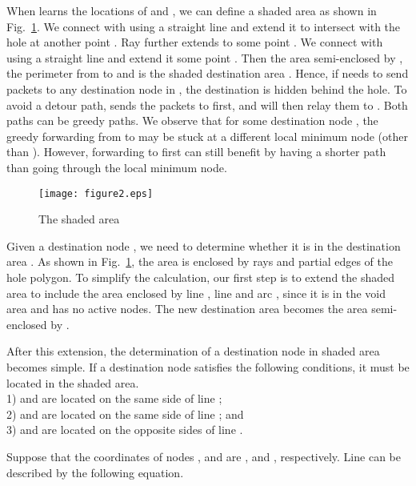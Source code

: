 \documentclass[3p,times]{elsarticle}
\begin{document}
When  learns the locations of  and , we can define a shaded area as shown in Fig.~\ref{fig2}.
We connect  with  using a straight line and extend it to intersect with the hole at another point .
Ray  further extends to some point .
We connect  with  using a straight line and extend it some point .
Then the area semi-enclosed by , the perimeter from  to  and  is the
shaded destination area .
Hence, if  needs to send packets to any destination node  in ,
the destination is hidden behind the hole.
To avoid a detour path,  sends the packets to  first, and  will then relay them to .
Both paths can be greedy paths.
We observe that for some destination node , the greedy forwarding from  to  may
be stuck at a different local minimum node (other than ). However, forwarding to  first
can still benefit by having a shorter path than going through the local minimum node.

\begin{figure}[!htp]
\begin{center}
\texttt{[image: figure2.eps]}
\end{center}
\caption{The shaded area}
\label{fig2}
\end{figure}






Given a destination node , we need to determine whether it is in the destination area .
As shown in Fig.~\ref{fig2}, the area is enclosed by rays and partial edges of the hole polygon.
To simplify the calculation, our first step is to extend the shaded area to include
the area enclosed by line , line  and arc ,
since it is in the void area and has no active nodes.
The new destination area becomes the area semi-enclosed by .

After this extension, the determination of a destination node  in shaded area becomes simple.
If a destination node  satisfies the following conditions, it must be located in the shaded area. \\

\text{} 1)  and  are located on the same side of line ;\\
\text{~~~~~~} 2)  and  are located on the same side of line ; and \\
\text{~~~~~~} 3)  and  are located on the opposite sides of line .

\vspace{0.1in}

Suppose that the coordinates of nodes ,  and  are ,  and ,
respectively.
Line  can be described by the following equation.
\end{document}
